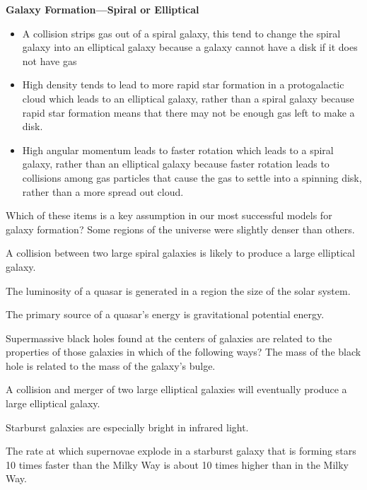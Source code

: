 \textbf{Galaxy Formation—Spiral or Elliptical}
\begin{itemize}
\item A collision strips gas out of a spiral galaxy, this tend to change the spiral galaxy into an elliptical galaxy because a galaxy cannot have a disk if it does not have gas
\item High density tends to lead to more rapid star formation in a protogalactic cloud which leads to an elliptical galaxy, rather than a spiral galaxy because rapid star formation means that there may not be enough gas left to make a disk.
\item High angular momentum leads to faster rotation which leads to a spiral galaxy, rather than an elliptical galaxy because faster rotation leads to collisions among gas particles that cause the gas to settle into a spinning disk, rather than a more spread out cloud.
\end{itemize}

Which of these items is a key assumption in our most successful models for galaxy formation? Some regions of the universe were slightly denser than others.

A collision between two large spiral galaxies is likely to produce a large elliptical galaxy.

The luminosity of a quasar is generated in a region the size of the solar system.

The primary source of a quasar's energy is gravitational potential energy.

Supermassive black holes found at the centers of galaxies are related to the properties of those galaxies in which of the following ways? The mass of the black hole is related to the mass of the galaxy’s bulge.

A collision and merger of two large elliptical galaxies will eventually produce a large elliptical galaxy.

Starburst galaxies are especially bright in infrared light.

The rate at which supernovae explode in a starburst galaxy that is forming stars 10 times faster than the Milky Way is about 10 times higher than in the Milky Way.
